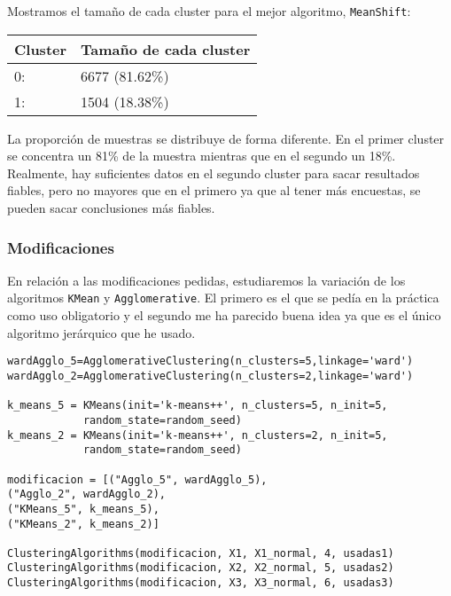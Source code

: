 	
	
	
	Mostramos el tamaño de cada cluster para el mejor algoritmo, \texttt{MeanShift}:
	
	\begin{table}[H]
	\centering
			\begin{tabular}{|l|l|}
				\hline
				\textbf{Cluster} & \textbf{Tamaño de cada cluster} \\ \hline
				0:               & 6677 (81.62\%)                  \\ \hline
				1:               & 1504 (18.38\%)                  \\ \hline
			\end{tabular}%
		
	\end{table}

	La proporción de muestras se distribuye de forma diferente. En el primer cluster se concentra un 81\% de la muestra mientras que en el segundo un 18\%. Realmente, hay suficientes datos en el segundo cluster para sacar resultados fiables, pero no mayores que en el primero ya que al tener más encuestas, se pueden sacar conclusiones más fiables.
	
	
	\subsubsection{Modificaciones}
	
	En relación a las modificaciones pedidas, estudiaremos la variación de los algoritmos \texttt{KMean} y \texttt{Agglomerative}. El primero es el que se pedía en la práctica como uso obligatorio y el segundo me ha parecido buena idea ya que es el único algoritmo jerárquico que he usado.
	
	
	\begin{lstlisting}[frame=single]
wardAgglo_5=AgglomerativeClustering(n_clusters=5,linkage='ward')
wardAgglo_2=AgglomerativeClustering(n_clusters=2,linkage='ward')
	
k_means_5 = KMeans(init='k-means++', n_clusters=5, n_init=5,
			random_state=random_seed)
k_means_2 = KMeans(init='k-means++', n_clusters=2, n_init=5, 
			random_state=random_seed)
	
modificacion = [("Agglo_5", wardAgglo_5),
("Agglo_2", wardAgglo_2),
("KMeans_5", k_means_5),
("KMeans_2", k_means_2)]
	
ClusteringAlgorithms(modificacion, X1, X1_normal, 4, usadas1)
ClusteringAlgorithms(modificacion, X2, X2_normal, 5, usadas2)
ClusteringAlgorithms(modificacion, X3, X3_normal, 6, usadas3)
	\end{lstlisting}
	

